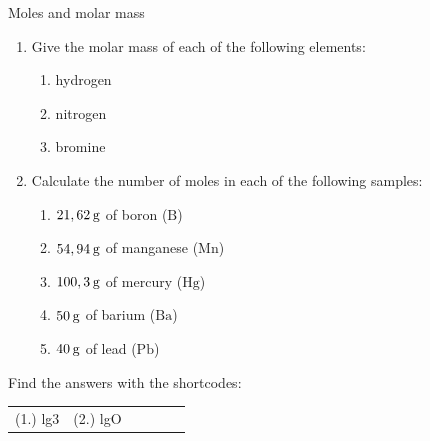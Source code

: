             \begin{exercises}{ Moles and molar mass
      }
            \nopagebreak
      \label{m38717*id277281}\begin{enumerate}[noitemsep, label=\textbf{\arabic*}. ] 
            \label{m38717*uid14}\item Give the molar mass of each of the following elements:
\label{m38717*id277295}\begin{enumerate}[noitemsep, label=\textbf{\alph*}. ] 
            \label{m38717*uid15}\item hydrogen
\label{m38717*uid16}\item nitrogen
\label{m38717*uid17}\item bromine
\end{enumerate}
                \label{m38717*uid18}\item Calculate the number of moles in each of the following samples:
\label{m38717*id277346}\begin{enumerate}[noitemsep, label=\textbf{\alph*}. ] 
            \label{m38717*uid19}\item $21,62\phantom{\rule{2pt}{0ex}}\mathrm{g}$ of boron ($\mathrm{B}$)
\label{m38717*uid20}\item $54,94\phantom{\rule{2pt}{0ex}}\mathrm{g}$ of manganese ($\mathrm{Mn}$)
\label{m38717*uid21}\item $100,3\phantom{\rule{2pt}{0ex}}\mathrm{g}$ of mercury ($\mathrm{Hg}$)
\label{m38717*uid22}\item $50\phantom{\rule{2pt}{0ex}}\mathrm{g}$ of barium ($\mathrm{Ba}$)
\label{m38717*uid23}\item $40\phantom{\rule{2pt}{0ex}}\mathrm{g}$ of lead ($\mathrm{Pb}$)
\end{enumerate}
                \end{enumerate}
    \label{m38717*cid4}
\par {} Find the answers with the shortcodes:
 \par \begin{tabular}[h]{cccccc}
 (1.) lg3  &  (2.) lgO  & \end{tabular}
\end{exercises}

